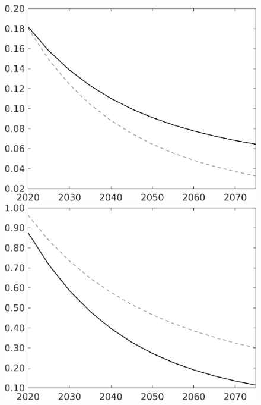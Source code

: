 \documentclass[12pt]{article}
\begin{document}
\begin{figure}[h!!]
\begin{minipage}[]{0.32\textwidth}
	\end{minipage}		
	\begin{minipage}[]{0.32\textwidth}
		\includegraphics[width=1\textwidth]{../../codding_model/own_basedOnFried/optimalPol_010922_revision/figures/all_13Sept22/LevTaufNoTauf_TaulCalib_Equlab_regime0_pf_spillover0_nsk1_xgr0_knspil1_sep1_LFlimit0_emsbase0_countec0_GovRev0_etaa0.79_lgd0.png}
	\end{minipage}
	\begin{minipage}[]{0.32\textwidth}
		\includegraphics[width=1\textwidth]{../../codding_model/own_basedOnFried/optimalPol_010922_revision/figures/all_13Sept22/LevTaufNoTauf_TaulCalib_Equlab_regime0_pg_spillover0_nsk1_xgr0_knspil1_sep1_LFlimit0_emsbase0_countec0_GovRev0_etaa0.79_lgd0.png}

\end{minipage}
\end{figure}
\end{document}
